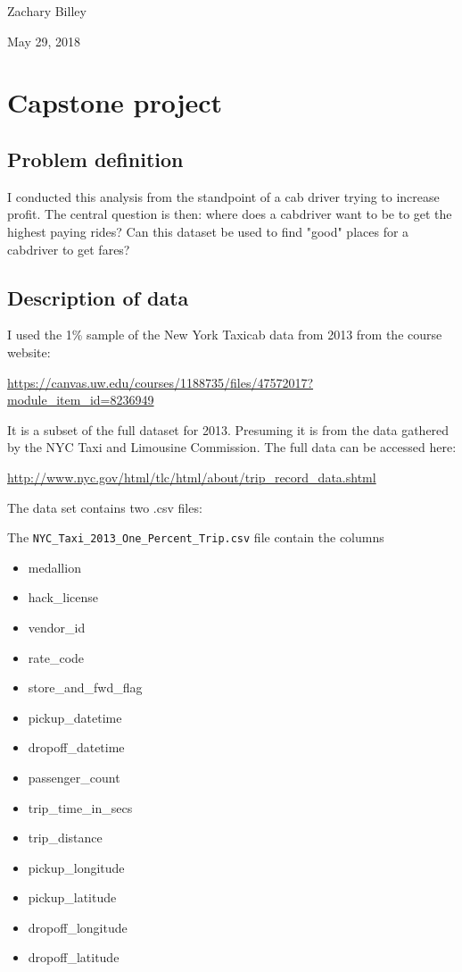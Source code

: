 \documentclass[10pt]{article} %
\begin{document}
Zachary Billey

May 29, 2018

\section*{Capstone project}
\subsection*{Problem definition}
I conducted this analysis from the standpoint of a cab driver trying to increase profit.
The central question is then: where does a cabdriver want to be to get the highest paying rides? Can this dataset be used to find "good" places for a cabdriver to get fares?

\subsection*{Description of data}
I used the 1\% sample of the New York Taxicab data from 2013 from the course website:

\url{https://canvas.uw.edu/courses/1188735/files/47572017?module_item_id=8236949}

\vspace*{12pt}

\noindent It is a subset of the full dataset for 2013. Presuming it is from the data gathered by the NYC Taxi and Limousine Commission. The full data  can be accessed here:

\url{http://www.nyc.gov/html/tlc/html/about/trip_record_data.shtml}
\vspace*{12pt}

\noindent The data set contains two .csv files:

The \verb|NYC_Taxi_2013_One_Percent_Trip.csv| file contain the columns
\begin{multicols}{3}
\begin{itemize}
\item medallion
\item hack\_license
\item vendor\_id
\item rate\_code
\item store\_and\_fwd\_flag
\item pickup\_datetime
\item dropoff\_datetime
\item passenger\_count
\item trip\_time\_in\_secs
\item trip\_distance
\item pickup\_longitude
\item pickup\_latitude
\item dropoff\_longitude
\item dropoff\_latitude
\end{itemize}
\end{multicols}
\end{document}
